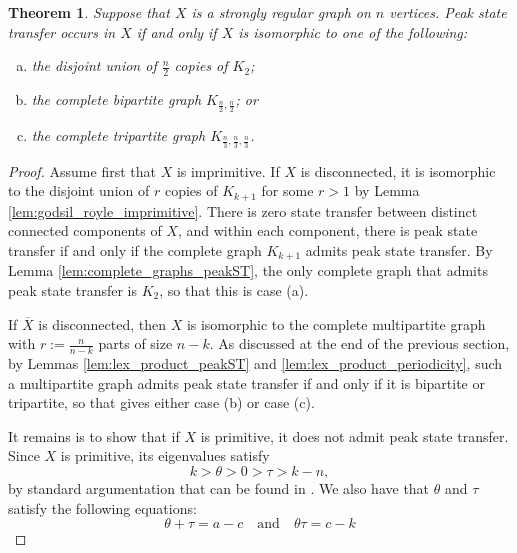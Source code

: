 \documentclass{article}
\newtheorem{theorem}{Theorem}[section]
\numberwithin{equation}{section}
\begin{document}
\begin{theorem}
\label{thm:SRGs_peakST}
 Suppose that $X$ is a strongly regular graph on $n$ vertices. Peak state transfer occurs in $X$ if and only if $X$ is isomorphic to one of the following:
 \begin{enumerate}[(a)]
     \item the disjoint union of $\frac{n}{2}$ copies of $K_2$;
    \item the  complete bipartite graph $K_{\frac{n}{2},\frac{n}{2}}$; or 
    \item the complete tripartite graph $K_{\frac{n}{3},\frac{n}{3},\frac{n}{3}}$. 
 \end{enumerate}
\end{theorem}
\begin{proof}
Assume first that $X$ is imprimitive. If $X$ is disconnected, it is isomorphic to the disjoint union of $r$ copies of $K_{k+1}$ for some $r > 1$ by Lemma \ref{lem:godsil_royle_imprimitive}. There is zero state transfer between distinct connected components of $X$, and within each component, there is peak state transfer if and only if the complete graph $K_{k+1}$ admits peak state transfer. By Lemma \ref{lem:complete_graphs_peakST}, the only complete graph that admits peak state transfer is $K_2$, so that this is case (a).

If $\overline{X}$ is disconnected, then $X$ is isomorphic to the complete multipartite graph with $r := \frac{n}{n-k}$ parts of size $n-k$. As discussed at the end of the previous section, by Lemmas \ref{lem:lex_product_peakST} and \ref{lem:lex_product_periodicity}, such a multipartite graph admits peak state transfer if and only if it is bipartite or tripartite, so that gives either case (b) or case (c).

It remains is to show that if $X$ is primitive, it does not admit peak state transfer. Since $X$ is primitive, its eigenvalues satisfy
\begin{equation}
\label{eq:srg_eigenvalues_primitive}
k > \theta > 0 > \tau > k-n,
\end{equation}
by standard argumentation that can be found in \cite{GodRoy2001}. We also have that $\theta$ and $\tau$ satisfy the following equations:
\begin{equation}
\label{eq:srg_theta_tau_equations}
\theta + \tau = a - c \quad \text{and} \quad \theta\tau = c - k
\end{equation}


\end{proof}
\end{document}
